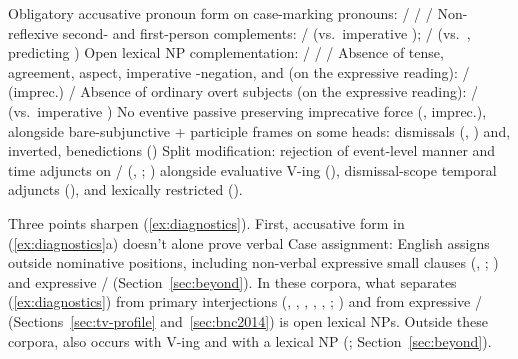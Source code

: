 \documentclass[12pt]{article}
\begin{document}
\ea\label{ex:diagnostics}
\ea Obligatory accusative pronoun form on case-marking pronouns:  /  /  / 
\ex Non-reflexive second- and first-person complements:  /  (vs.\ imperative );  /  (vs.\ , predicting )
\ex Open lexical NP complementation:  /  /  / 
\ex Absence of tense, agreement, aspect, imperative -negation, and  (on the expressive reading):  /  (imprec.) / 
\ex Absence of ordinary overt subjects (on the expressive reading):  /  (vs.\ imperative )
\ex No eventive passive preserving imprecative force (, imprec.), alongside bare-subjunctive  + participle frames on some heads: dismissals (, ) and, inverted, benedictions ()
\ex Split modification: rejection of event-level manner and time adjuncts on / (, ; \citealp[5--6]{quang1971}) alongside evaluative  V-ing (), dismissal-scope temporal adjuncts (), and lexically restricted  ().
\z
\z

Three points sharpen (\ref{ex:diagnostics}). First, accusative form in (\ref{ex:diagnostics}a) doesn't alone prove verbal Case assignment: English assigns  outside nominative positions, including non-verbal expressive small clauses (, ; \citealp{schutze2001,pottsroeper2006}) and expressive  /  (Section~\ref{sec:beyond}). In these corpora, what separates (\ref{ex:diagnostics}) from primary interjections (, , , , , ; \citealp{ameka1992,amekawilkins2006,meinard2015}) and from expressive / (Sections~\ref{sec:tv-profile} and~\ref{sec:bnc2014}) is open lexical NPs. Outside these corpora,  also occurs with  V-ing and with a lexical NP (; Section~\ref{sec:beyond}).
\end{document}
